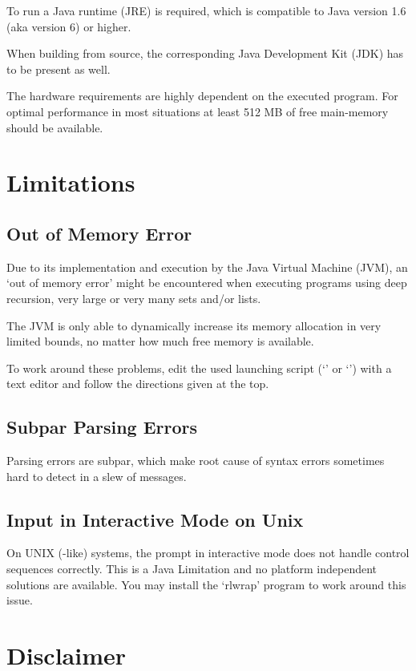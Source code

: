 To run \setlX{} a Java runtime (JRE) is required, which is compatible to Java version 1.6 (aka version 6) or higher.

When building from source, the corresponding Java Development Kit (JDK) has to be present as well.

The hardware requirements are highly dependent on the executed \SetlX{} program. For optimal performance in most situations at least 512 MB of free main-memory should be available.

\section{Limitations}

\subsection{Out of Memory Error}

Due to its implementation and execution by the Java Virtual Machine (JVM), an `out of memory error' might be encountered when executing \SetlX{} programs using deep recursion, very large or very many sets and\slash{}or lists.

The JVM is only able to dynamically increase its memory allocation in very limited bounds, no matter how much free memory is available.

To work around these problems, edit the used launching script (`' or `') with a text editor and follow the directions given at the top.

\subsection{Subpar Parsing Errors}

Parsing errors are subpar, which make root cause of syntax errors sometimes hard to detect in a slew of messages.

\subsection{Input in Interactive Mode on Unix}

On UNIX (-like) systems, the prompt in interactive mode does not handle control sequences correctly. This is a Java Limitation and no platform independent solutions are available. You may install the `rlwrap' program to work around this issue.

%


\section{Disclaimer}



